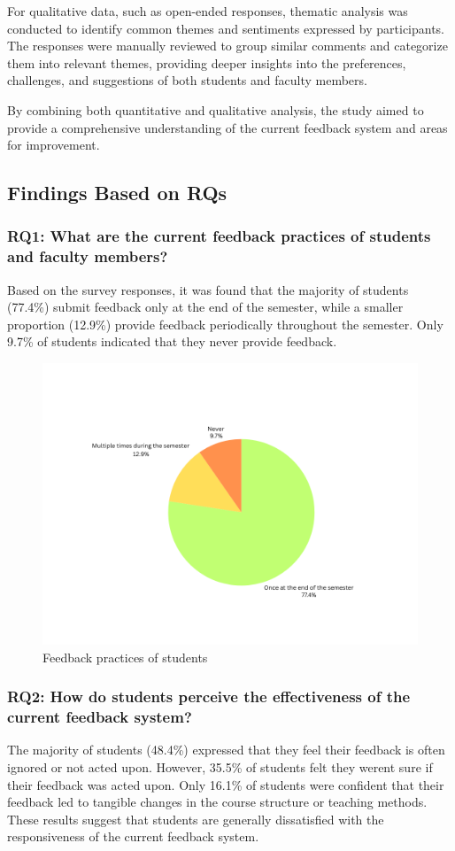 \documentclass[conference]{IEEEtran}
\begin{document}
For qualitative data, such as open-ended responses, thematic analysis was conducted to identify common themes and sentiments expressed by participants. The responses were manually reviewed to group similar comments and categorize them into relevant themes, providing deeper insights into the preferences, challenges, and suggestions of both students and faculty members.

By combining both quantitative and qualitative analysis, the study aimed to provide a comprehensive understanding of the current feedback system and areas for improvement.


\subsection{Findings Based on RQs}

\subsubsection{RQ1: What are the current feedback practices of students and faculty members?}
Based on the survey responses, it was found that the majority of students (77.4\%) submit feedback only at the end of the semester, while a smaller proportion (12.9\%) provide feedback periodically throughout the semester. Only 9.7\% of students indicated that they never provide feedback.

\begin{figure}[htbp]
    \centering
    \includegraphics[width=0.8\linewidth]{feedback_practices.png}
    \caption{Feedback practices of students}
    \label{fig:feedback_practices}
\end{figure}



\subsubsection{RQ2: How do students perceive the effectiveness of the current feedback system?}
The majority of students (48.4\%) expressed that they feel their feedback is often ignored or not acted upon. However, 35.5\% of students felt they werent sure if their feedback was acted upon. Only 16.1\% of students were confident that their feedback led to tangible changes in the course structure or teaching methods. These results suggest that students are generally dissatisfied with the responsiveness of the current feedback system.
\end{document}
